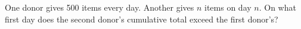 One donor gives 500 items every day. Another gives $n$ items on day $n$. On what first day does the second donor's cumulative total exceed the first donor's?
